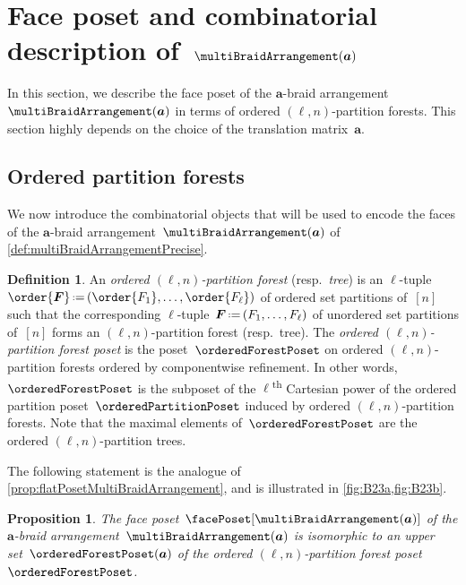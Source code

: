 \documentclass{amsart}
\newcommand{\darkblue}{\color{darkblue}} %
\newtheorem{proposition}[theorem]{Proposition}
\theoremstyle{definition}
\newtheorem{definition}[theorem]{Definition}
\renewcommand{\b}[1]{{\boldsymbol{#1}}} %
\newcommand{\eqdef}{\mbox{\,\raisebox{0.2ex}{\scriptsize\ensuremath{\mathrm:}}\ensuremath{=}\,}} %
\newcommand{\resp}{resp.~} %
\newcommand{\ordinal}{\textsuperscript{th}} %
\newcommand{\defn}[1]{\textsl{\darkblue #1}} %
\renewcommand{\b}[1]{\boldsymbol{#1}} %
\begin{document}

\section{Face poset and combinatorial description of~$\multiBraidArrangement(\b{a})$}
\label{sec:facePoset}

In this section, we describe the face poset of the $\b{a}$-braid arrangement~$\multiBraidArrangement(\b{a})$ in terms of ordered $(\ell,n)$-partition forests.
This section highly depends on the choice of the translation matrix~$\b{a}$.


\subsection{Ordered partition forests}
\label{subsec:orderedPartitionForests}

We now introduce the combinatorial objects that will be used to encode the faces of the $\b{a}$-braid arrangement~$\multiBraidArrangement(\b{a})$ of \cref{def:multiBraidArrangementPrecise}.

\begin{definition}
\label{def:orderedPartitionForest}
An \defn{ordered $(\ell,n)$-partition forest} (\resp \defn{tree}) is an $\ell$-tuple~$\order{\b{F}} \eqdef (\order{F_1}, \dots, \order{F_\ell})$ of ordered set partitions of~$[n]$ such that the corresponding $\ell$-tuple~$\b{F} \eqdef (F_1, \dots, F_\ell)$ of unordered set partitions of~$[n]$ forms an $(\ell,n)$-partition forest (\resp tree).
The \defn{ordered $(\ell,n)$-partition forest poset} is the poset~$\orderedForestPoset$ on ordered $(\ell,n)$-partition forests ordered by componentwise refinement.
In other words, $\orderedForestPoset$ is the subposet of the $\ell$\ordinal{} Cartesian power of the ordered partition poset~$\orderedPartitionPoset$ induced by ordered $(\ell,n)$-partition forests.
Note that the maximal elements of~$\orderedForestPoset$ are the ordered $(\ell, n)$-partition trees.
\end{definition}

The following statement is the analogue of \cref{prop:flatPosetMultiBraidArrangement}, and is illustrated in \cref{fig:B23a,fig:B23b}.

\begin{proposition}
\label{prop:facePosetMultiBraidArrangement}
The face poset~$\facePoset[\multiBraidArrangement(\b{a})]$ of the $\b{a}$-braid arrangement~$\multiBraidArrangement(\b{a})$ is isomorphic to an upper set~$\orderedForestPoset(\b{a})$ of the ordered $(\ell,n)$-partition forest poset~$\orderedForestPoset$.
\end{proposition}
\end{document}
